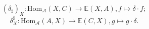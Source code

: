 \documentclass[preview]{standalone}
\begin{document}
\begin{center}
$$(\delta_\sharp)_X: \text{Hom}_\mathscr{A}(X,C) \to \mathbb{E}(X,A), f\mapsto \delta\cdot f;$$$$\delta_X^\sharp:\text{Hom}_\mathscr{A}(A,X) \to \mathbb{E}(C,X), g\mapsto g\cdot\delta.$$
\end{center}
\end{document}
